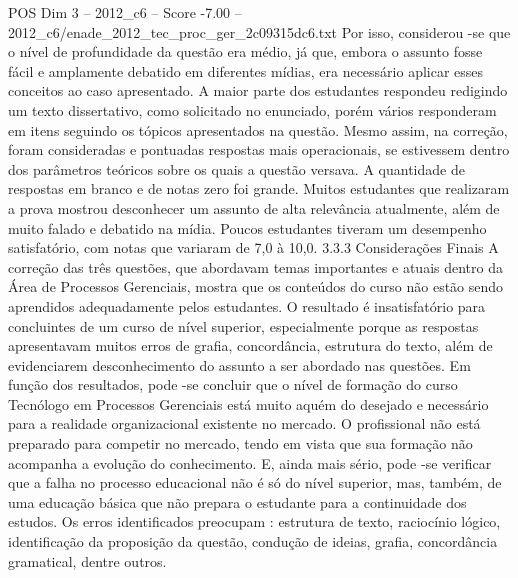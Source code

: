 \begin{textsample}{POS Dim 3 – 2012\_c6 – Score -7.00 – 2012\_c6/enade\_2012\_tec\_proc\_ger\_2c09315dc6.txt}
Por isso, considerou -se que o nível de profundidade da questão era médio, já que, embora o assunto fosse fácil e amplamente debatido em diferentes mídias, era necessário aplicar esses conceitos ao caso apresentado.
A maior parte dos estudantes respondeu redigindo um texto dissertativo, como solicitado no enunciado, porém vários responderam em itens seguindo os tópicos apresentados na questão.
Mesmo assim, na correção, foram consideradas e pontuadas respostas mais operacionais, se estivessem dentro dos parâmetros teóricos sobre os quais a questão versava.
A quantidade de respostas em branco e de notas zero foi grande.
Muitos estudantes que realizaram a prova mostrou desconhecer um assunto de alta relevância atualmente, além de muito falado e debatido na mídia.
Poucos estudantes tiveram um desempenho satisfatório, com notas que variaram de 7,0 à 10,0. 3.3.3 Considerações Finais A correção das três questões, que abordavam temas importantes e atuais dentro da Área de Processos Gerenciais, mostra que os conteúdos do curso não estão sendo aprendidos adequadamente pelos estudantes.
O resultado é insatisfatório para concluintes de um curso de nível superior, especialmente porque as respostas apresentavam muitos erros de grafia, concordância, estrutura do texto, além de evidenciarem desconhecimento do assunto a ser abordado nas questões.
Em função dos resultados, pode -se concluir que o nível de formação do curso Tecnólogo em Processos Gerenciais está muito aquém do desejado e necessário para a realidade organizacional existente no mercado.
O profissional não está preparado para competir no mercado, tendo em vista que sua formação não acompanha a evolução do conhecimento.
E, ainda mais sério, pode -se verificar que a falha no processo educacional não é só do nível superior, mas, também, de uma educação básica que não prepara o estudante para a continuidade dos estudos.
Os erros identificados preocupam : estrutura de texto, raciocínio lógico, identificação da proposição da questão, condução de ideias, grafia, concordância gramatical, dentre outros.

\end{textsample}
